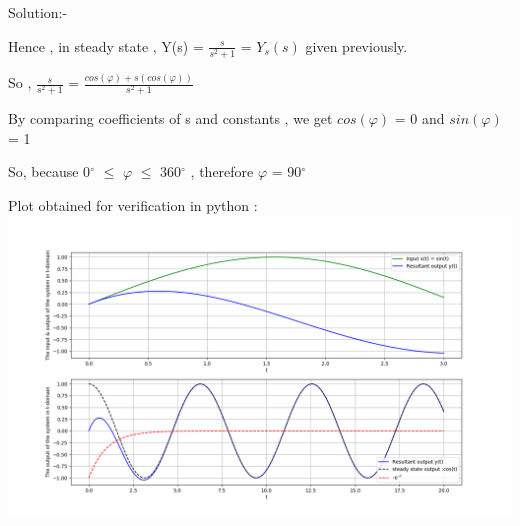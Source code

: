 \documentclass[journal,12pt,twocolumn]{IEEEtran}
\begin{document}
\begin{frame}{Solution:- }
\begin{frame}{}
\begin{frame}{}
\vspace{4 mm}
Hence , in steady state , Y(s) = $\frac{s}{s^2 + 1}$ = $Y_s(s)$ given previously.

\vspace{4 mm}
So , $\frac{s}{s^2 + 1}$ = $\frac{cos(\varphi) + s(cos(\varphi))}{s^2 + 1}$

\vspace{4 mm}
By comparing coefficients of s and constants , we get $cos(\varphi)$ = 0 and $sin(\varphi)$ = 1 

\vspace{4 mm}

 

 So, because 0$^{\circ}$ $\leq$ $\varphi$ $\leq$ 360$^{\circ}$ , therefore $\varphi$ = 90$^{\circ}$


\end{frame}

\begin{frame}{}

Plot obtained for verification in python :
\setlength{\parindent}{1cm}
\includegraphics[scale=0.25]{./figs/Output_plot.png}


\end{frame}
\end{frame}
\end{frame}
\end{document}
